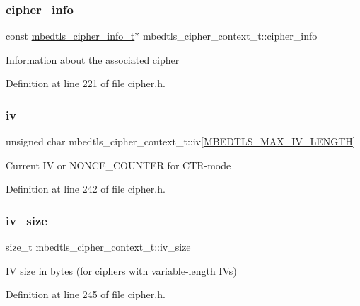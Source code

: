 \subsubsection{\texorpdfstring{cipher\+\_\+info}{cipher\_info}}
{\footnotesize\ttfamily const \mbox{\hyperlink{structmbedtls__cipher__info__t}{mbedtls\+\_\+cipher\+\_\+info\+\_\+t}}$\ast$ mbedtls\+\_\+cipher\+\_\+context\+\_\+t\+::cipher\+\_\+info}

Information about the associated cipher 

Definition at line 221 of file cipher.\+h.

\mbox{\label{structmbedtls__cipher__context__t_a19262f2c275b31180e7412f4bcef0e7f}} 
\subsubsection{\texorpdfstring{iv}{iv}}
{\footnotesize\ttfamily unsigned char mbedtls\+\_\+cipher\+\_\+context\+\_\+t\+::iv\mbox{[}\mbox{\hyperlink{cipher_8h_aec294721b811aa0f7dcc940029fd8aab}{M\+B\+E\+D\+T\+L\+S\+\_\+\+M\+A\+X\+\_\+\+I\+V\+\_\+\+L\+E\+N\+G\+TH}}\mbox{]}}

Current IV or N\+O\+N\+C\+E\+\_\+\+C\+O\+U\+N\+T\+ER for C\+T\+R-\/mode 

Definition at line 242 of file cipher.\+h.

\mbox{\label{structmbedtls__cipher__context__t_af11d1d21da68ef00a46d96d9de326206}} 
\subsubsection{\texorpdfstring{iv\+\_\+size}{iv\_size}}
{\footnotesize\ttfamily size\+\_\+t mbedtls\+\_\+cipher\+\_\+context\+\_\+t\+::iv\+\_\+size}

IV size in bytes (for ciphers with variable-\/length I\+Vs) 

Definition at line 245 of file cipher.\+h.

\mbox{\label{structmbedtls__cipher__context__t_ac949d799444e6379acf0125891c04763}} 
